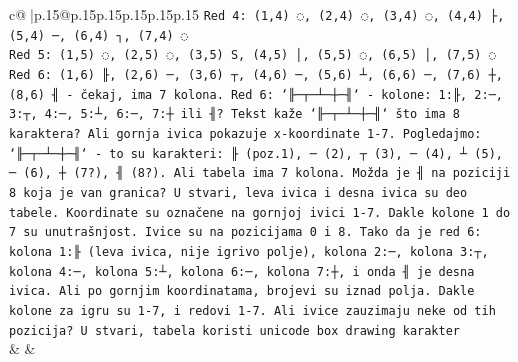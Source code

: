 \documentclass{article}
\begin{document}
{\begin{supertabular}{c@{$\;$}|p{.15\linewidth}@{}p{.15\linewidth}p{.15\linewidth}p{.15\linewidth}p{.15\linewidth}p{.15\linewidth}}
{{{\texttt{Red 4: (1,4) ◌, (2,4) ◌, (3,4) ◌, (4,4) ├, (5,4) ─, (6,4) ┐, (7,4) ◌} \\
\texttt{Red 5: (1,5) ◌, (2,5) ◌, (3,5) S, (4,5) │, (5,5) ◌, (6,5) │, (7,5) ◌} \\
\texttt{Red 6: (1,6) ╟, (2,6) ─, (3,6) ┬, (4,6) ─, (5,6) ┴, (6,6) ─, (7,6) ┼, (8,6) ╢ {-} čekaj, ima 7 kolona. Red 6: `╟─┬─┴─┼─╢` {-} kolone: 1:╟, 2:─, 3:┬, 4:─, 5:┴, 6:─, 7:┼ ili ╢? Tekst kaže `╟─┬─┴─┼─╢` što ima 8 karaktera? Ali gornja ivica pokazuje x{-}koordinate 1{-}7. Pogledajmo: `╟─┬─┴─┼─╢` {-} to su karakteri: ╟ (poz.1), ─ (2), ┬ (3), ─ (4), ┴ (5), ─ (6), ┼ (7?), ╢ (8?). Ali tabela ima 7 kolona. Možda je ╢ na poziciji 8 koja je van granica? U stvari, leva ivica i desna ivica su deo tabele. Koordinate su označene na gornjoj ivici 1{-}7. Dakle kolone 1 do 7 su unutrašnjost. Ivice su na pozicijama 0 i 8. Tako da je red 6: kolona 1:╟ (leva ivica, nije igrivo polje), kolona 2:─, kolona 3:┬, kolona 4:─, kolona 5:┴, kolona 6:─, kolona 7:┼, i onda ╢ je desna ivica. Ali po gornjim koordinatama, brojevi su iznad polja. Dakle kolone za igru su 1{-}7, i redovi 1{-}7. Ali ivice zauzimaju neke od tih pozicija? U stvari, tabela koristi unicode box drawing karakter} \\
            }
        }
    }
    & & \\ \\


\end{supertabular}}
\end{document}
